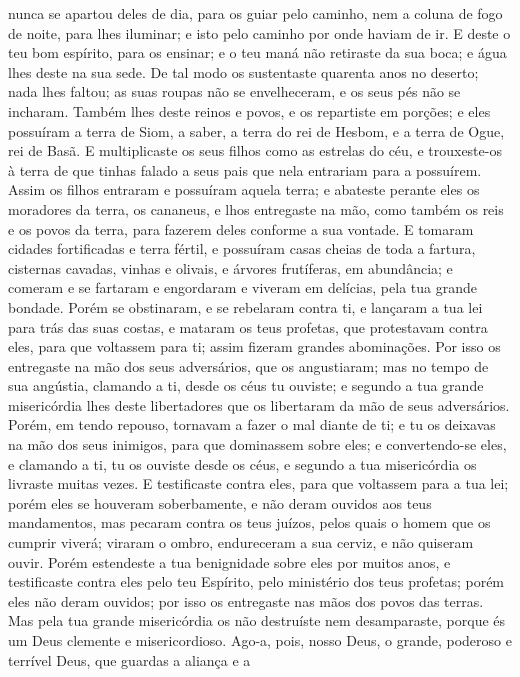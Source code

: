 nunca se apartou deles de dia, para os guiar pelo caminho, nem a
coluna de fogo de noite, para lhes iluminar; e isto pelo caminho por
onde haviam de ir. E deste o teu bom espírito, para os
ensinar; e o teu maná não retiraste da sua boca; e água lhes deste
na sua sede. De tal modo os sustentaste quarenta anos no
deserto; nada lhes faltou; as suas roupas não se envelheceram, e os
seus pés não se incharam. Também lhes deste reinos e povos, e
os repartiste em porções; e eles possuíram a terra de Siom, a saber,
a terra do rei de Hesbom, e a terra de Ogue, rei de Basã. E
multiplicaste os seus filhos como as estrelas do céu, e trouxeste-os
à terra de que tinhas falado a seus pais que nela entrariam para a
possuírem. Assim os filhos entraram e possuíram aquela terra;
e abateste perante eles os moradores da terra, os cananeus, e lhos
entregaste na mão, como também os reis e os povos da terra, para
fazerem deles conforme a sua vontade. E tomaram cidades
fortificadas e terra fértil, e possuíram casas cheias de toda a
fartura, cisternas cavadas, vinhas e olivais, e árvores frutíferas,
em abundância; e comeram e se fartaram e engordaram e viveram em
delícias, pela tua grande bondade. Porém se obstinaram, e se
rebelaram contra ti, e lançaram a tua lei para trás das suas costas,
e mataram os teus profetas, que protestavam contra eles, para que
voltassem para ti; assim fizeram grandes abominações. Por
isso os entregaste na mão dos seus adversários, que os angustiaram;
mas no tempo de sua angústia, clamando a ti, desde os céus tu
ouviste; e segundo a tua grande misericórdia lhes deste libertadores
que os libertaram da mão de seus adversários. Porém, em tendo
repouso, tornavam a fazer o mal diante de ti; e tu os deixavas na
mão dos seus inimigos, para que dominassem sobre eles; e
convertendo-se eles, e clamando a ti, tu os ouviste desde os céus, e
segundo a tua misericórdia os livraste muitas vezes. E
testificaste contra eles, para que voltassem para a tua lei; porém
eles se houveram soberbamente, e não deram ouvidos aos teus
mandamentos, mas pecaram contra os teus juízos, pelos quais o homem
que os cumprir viverá; viraram o ombro, endureceram a sua cerviz, e
não quiseram ouvir. Porém estendeste a tua benignidade sobre
eles por muitos anos, e testificaste contra eles pelo teu Espírito,
pelo ministério dos teus profetas; porém eles não deram ouvidos; por
isso os entregaste nas mãos dos povos das terras. Mas pela
tua grande misericórdia os não destruíste nem desamparaste, porque
és um Deus clemente e misericordioso. Ago-a, pois, nosso
Deus, o grande, poderoso e terrível Deus, que guardas a aliança e a
